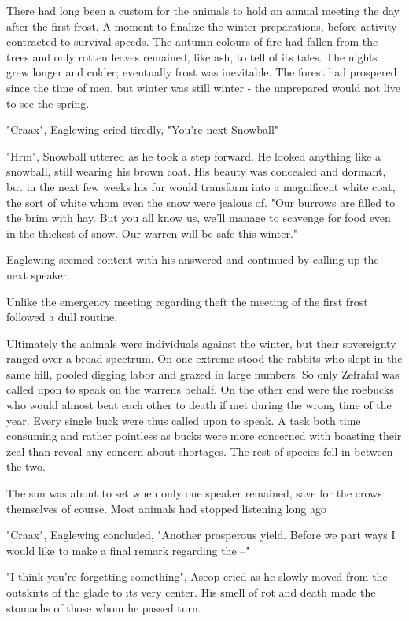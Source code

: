 \documentclass[smalldemyvopaper,11pt,twoside,onecolumn,openright,extrafontsizes]{memoir}
\begin{document}
There had long been a custom for the animals to hold an annual meeting the day after the first frost. A moment to finalize the winter preparations, before activity contracted to survival speeds. The autumn colours of fire had fallen from the trees and only rotten leaves remained, like ash, to tell of its tales. The nights grew longer and colder; eventually frost was inevitable. The forest had prospered since the time of men, but winter was still winter - the unprepared would not live to see the spring. 
 
"Craax", Eaglewing cried tiredly, "You're next Snowball"

"Hrm", Snowball uttered as he took a step forward. He looked anything like a snowball, still wearing his brown coat. His beauty was concealed and dormant, but in the next few weeks his fur would transform into a magnificent white coat, the sort of white whom even the snow were jealous of. "Our burrows are filled to the brim with hay. But you all know us, we'll manage to scavenge for food even in the thickest of snow. Our warren will be safe this winter."

Eaglewing seemed content with his answered and continued by calling up the next speaker. 

Unlike the emergency meeting regarding theft the meeting of the first frost followed a dull routine. 

Ultimately the animals were individuals against the winter, but their sovereignty ranged over a broad spectrum. On one extreme stood the rabbits who slept in the same hill, pooled digging labor and grazed in large numbers. So only Zefrafal was called upon to speak on the warrens behalf. On the other end were the roebucks who would almost beat each other to death if met during the wrong time of the year. Every single buck were thus called upon to speak. A task both time consuming and rather pointless as bucks were more concerned with boasting their zeal than reveal any concern about shortages. The rest of species fell in between the two.

The sun was about to set when only one speaker remained, save for the crows themselves of course. Most animals had stopped listening long ago

"Craax", Eaglewing concluded, "Another prosperous yield. Before we part ways I would like to make a final remark regarding the --"

"I think you're forgetting something", Aseop cried as he slowly moved from the outskirts of the glade to its very center. His smell of rot and death made the stomachs of those whom he passed turn. 
\end{document}
